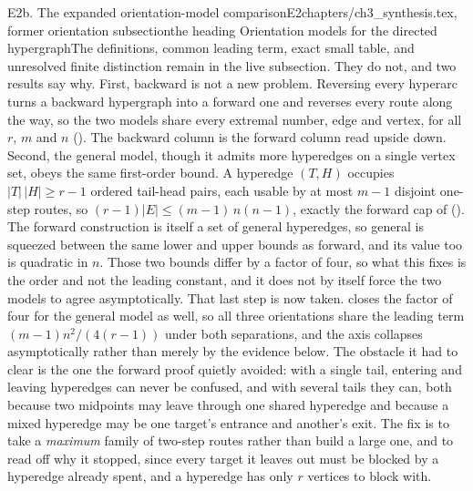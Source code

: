 \begin{offcut}{E2b. The expanded orientation-model comparison}{E2}{chapters/ch3\_synthesis.tex, former orientation subsection}{the heading Orientation models for the directed hypergraph}{The definitions, common leading term, exact small table, and unresolved finite distinction remain in the live subsection.}
They do not, and two results say why. First, backward is not a new problem. Reversing every hyperarc turns a backward hypergraph into a forward one and reverses every route along the way, so the two models share every extremal number, edge and vertex, for all $r$, $m$ and $n$ (). The backward column is the forward column read upside down. Second, the general model, though it admits more hyperedges on a single vertex set, obeys the same first-order bound. A hyperedge $(T, H)$ occupies $|T|\,|H| \ge r-1$ ordered tail-head pairs, each usable by at most $m-1$ disjoint one-step routes, so $(r-1)|E| \le (m-1)\,n(n-1)$, exactly the forward cap of  (). The forward construction is itself a set of general hyperedges, so general is squeezed between the same lower and upper bounds as forward, and its value too is quadratic in $n$. Those two bounds differ by a factor of four, so what this fixes is the order and not the leading constant, and it does not by itself force the two models to agree asymptotically. That last step is now taken.  closes the factor of four for the general model as well, so all three orientations share the leading term $(m-1)n^2/(4(r-1))$ under both separations, and the axis collapses asymptotically rather than merely by the evidence below. The obstacle it had to clear is the one the forward proof quietly avoided: with a single tail, entering and leaving hyperedges can never be confused, and with several tails they can, both because two midpoints may leave through one shared hyperedge and because a mixed hyperedge may be one target's entrance and another's exit. The fix is to take a \emph{maximum} family of two-step routes rather than build a large one, and to read off why it stopped, since every target it leaves out must be blocked by a hyperedge already spent, and a hyperedge has only $r$ vertices to block with.


\end{offcut}
